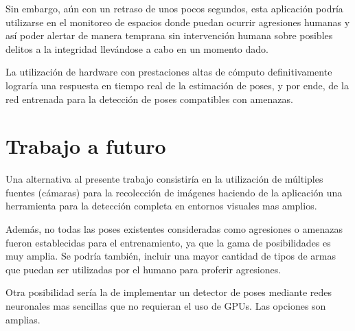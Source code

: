 \documentclass[a4paper,12pt,oneside,spanish]{book}
\begin{document}
Sin embargo, aún con un retraso de unos pocos segundos, esta aplicación podría utilizarse en el monitoreo de espacios donde puedan ocurrir agresiones humanas y así poder alertar de manera temprana sin intervención humana sobre posibles delitos a la integridad llevándose a cabo en un momento dado.\par

La utilización de hardware con prestaciones altas de cómputo definitivamente lograría una respuesta en tiempo real de la estimación de poses, y por ende, de la red entrenada para la detección de poses compatibles con amenazas. \par

\section{Trabajo a futuro}
Una alternativa al presente trabajo consistiría en la utilización de múltiples fuentes (cámaras) para la recolección de imágenes haciendo de la aplicación una herramienta para la detección completa en entornos visuales mas amplios.\par

Además, no todas las poses existentes consideradas como agresiones o amenazas fueron establecidas para el entrenamiento, ya que la gama de posibilidades es muy amplia. Se podría también, incluir una mayor cantidad de tipos de armas que puedan ser utilizadas por el humano para proferir agresiones.\par

Otra posibilidad sería la de implementar un detector de poses mediante redes neuronales mas sencillas que no requieran el uso de GPUs. Las opciones son amplias.\par
\end{document}
